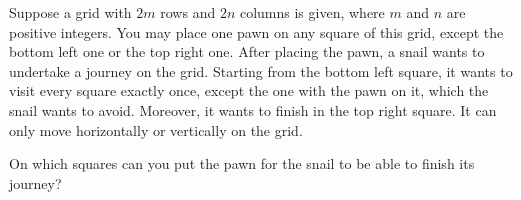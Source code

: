 Suppose a grid with $2m$ rows and $2n$ columns is given, where $m$ and $n$ are positive integers. You may place one pawn on any square of this grid, except the bottom left one or the top right one. After placing the pawn, a snail wants to undertake a journey on the grid. Starting from the bottom left square, it wants to visit every square exactly once, except the one with the pawn on it, which the snail wants to avoid. Moreover, it wants to finish in the top right square. It can only move horizontally or vertically on the grid.

On which squares can you put the pawn for the snail to be able to finish its journey?
